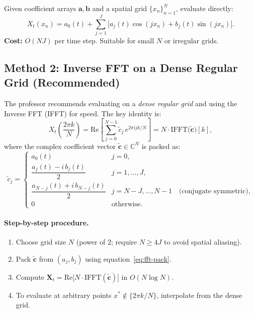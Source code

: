 \documentclass[12pt]{article}
\begin{document}
Given coefficient arrays $\mathbf{a}, \mathbf{b}$ and a spatial grid $\{x_n\}_{n=1}^N$, evaluate
directly:
\begin{equation}
  X_t(x_n) = a_0(t) + \sum_{j=1}^{J} \bigl[a_j(t)\cos(jx_n) + b_j(t)\sin(jx_n)\bigr].
  \label{eq:direct-eval}
\end{equation}
\textbf{Cost:} $O(NJ)$ per time step. Suitable for small $N$ or irregular grids.

\subsection{Method 2: Inverse FFT on a Dense Regular Grid (Recommended)}

The professor recommends evaluating on a \emph{dense regular grid} and using the Inverse FFT
(IFFT) for speed. The key identity is:
\[
  X_t\!\left(\frac{2\pi k}{N}\right) = \mathrm{Re}\left[ \sum_{j=0}^{N-1} \tilde{c}_j\, e^{2\pi i jk/N} \right]
  = N \cdot \mathrm{IFFT}\bigl(\tilde{\mathbf{c}}\bigr)[k],
\]
where the complex coefficient vector $\tilde{\mathbf{c}} \in \mathbb{C}^N$ is packed as:
\begin{equation}
  \tilde{c}_j = \begin{cases}
    a_0(t) & j = 0, \\[4pt]
    \dfrac{a_j(t) - i\, b_j(t)}{2} & j = 1,\ldots,J, \\[4pt]
    \dfrac{a_{N-j}(t) + i\, b_{N-j}(t)}{2} & j = N-J,\ldots,N-1 \quad \text{(conjugate symmetric)}, \\[4pt]
    0 & \text{otherwise}.
  \end{cases}
  \label{eq:fft-pack}
\end{equation}

\paragraph{Step-by-step procedure.}
\begin{enumerate}[noitemsep]
  \item Choose grid size $N$ (power of 2; require $N \geq 4J$ to avoid spatial aliasing).
  \item Pack $\tilde{\mathbf{c}}$ from $(a_j, b_j)$ using equation~\eqref{eq:fft-pack}.
  \item Compute $\mathbf{X}_t = \mathrm{Re}\bigl[N \cdot \mathrm{IFFT}(\tilde{\mathbf{c}})\bigr]$ in $O(N\log N)$.
  \item To evaluate at arbitrary points $x^* \notin \{2\pi k/N\}$, interpolate from the dense grid.
\end{enumerate}
\end{document}

